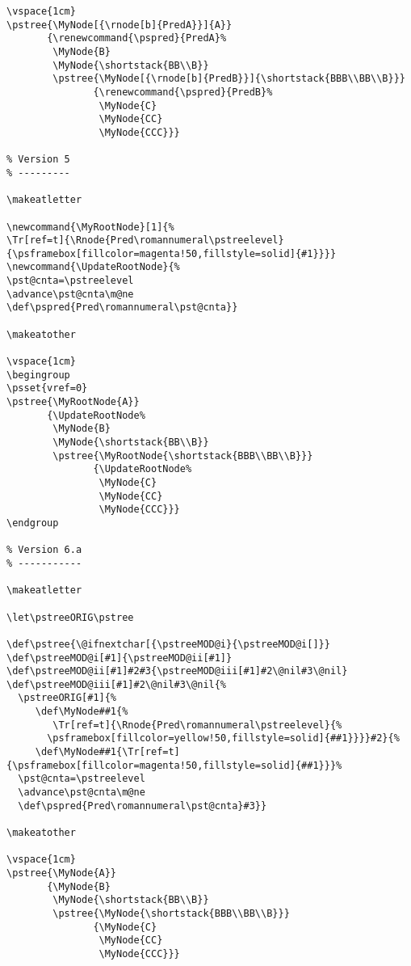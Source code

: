 \documentclass{article}
\begin{document}
\begin{verbatim}
\vspace{1cm}
\pstree{\MyNode[{\rnode[b]{PredA}}]{A}}
       {\renewcommand{\pspred}{PredA}%
        \MyNode{B}
        \MyNode{\shortstack{BB\\B}}
        \pstree{\MyNode[{\rnode[b]{PredB}}]{\shortstack{BBB\\BB\\B}}}
               {\renewcommand{\pspred}{PredB}%
                \MyNode{C}
                \MyNode{CC}
                \MyNode{CCC}}}

% Version 5
% ---------

\makeatletter

\newcommand{\MyRootNode}[1]{%
\Tr[ref=t]{\Rnode{Pred\romannumeral\pstreelevel}{\psframebox[fillcolor=magenta!50,fillstyle=solid]{#1}}}}
\newcommand{\UpdateRootNode}{%
\pst@cnta=\pstreelevel
\advance\pst@cnta\m@ne
\def\pspred{Pred\romannumeral\pst@cnta}}

\makeatother

\vspace{1cm}
\begingroup
\psset{vref=0}
\pstree{\MyRootNode{A}}
       {\UpdateRootNode%
        \MyNode{B}
        \MyNode{\shortstack{BB\\B}}
        \pstree{\MyRootNode{\shortstack{BBB\\BB\\B}}}
               {\UpdateRootNode%
                \MyNode{C}
                \MyNode{CC}
                \MyNode{CCC}}}
\endgroup

% Version 6.a
% -----------

\makeatletter

\let\pstreeORIG\pstree

\def\pstree{\@ifnextchar[{\pstreeMOD@i}{\pstreeMOD@i[]}}
\def\pstreeMOD@i[#1]{\pstreeMOD@ii[#1]}
\def\pstreeMOD@ii[#1]#2#3{\pstreeMOD@iii[#1]#2\@nil#3\@nil}
\def\pstreeMOD@iii[#1]#2\@nil#3\@nil{%
  \pstreeORIG[#1]{%
     \def\MyNode##1{%
        \Tr[ref=t]{\Rnode{Pred\romannumeral\pstreelevel}{%
	   \psframebox[fillcolor=yellow!50,fillstyle=solid]{##1}}}}#2}{%
     \def\MyNode##1{\Tr[ref=t]{\psframebox[fillcolor=magenta!50,fillstyle=solid]{##1}}}%
  \pst@cnta=\pstreelevel
  \advance\pst@cnta\m@ne
  \def\pspred{Pred\romannumeral\pst@cnta}#3}}

\makeatother

\vspace{1cm}
\pstree{\MyNode{A}}
       {\MyNode{B}
        \MyNode{\shortstack{BB\\B}}
        \pstree{\MyNode{\shortstack{BBB\\BB\\B}}}
               {\MyNode{C}
                \MyNode{CC}
                \MyNode{CCC}}}


\end{verbatim}
\end{document}
